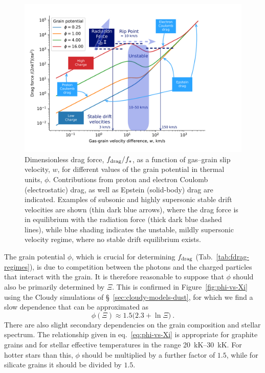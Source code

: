 \begin{figure}
  \includegraphics[width=\linewidth]{figs/gas-grain-drag-photoionized}
  \caption{Dimensionless drag force, \(f_{\text{drag}} / f_*\), as a function
    of gas--grain slip velocity, \(w\), for different values of the
    grain potential in thermal units, \(\phi\).  Contributions from
    proton and electron Coulomb (electrostatic) drag, as well as
    Epstein (solid-body) drag are indicated.  Examples of subsonic and
    highly supersonic stable drift velocities are shown (thin dark
    blue arrows), where the drag force is in equilibrium with the
    radiation force (thick dark blue dashed lines), while blue shading
    indicates the unstable, mildly supersonic velocity regime, where
    no stable drift equilibrium exists. }
  \label{fig:gas-grain-drag-photoionized}
\end{figure}

The grain potential \(\phi\), which is crucial for determining
\(f_{\text{drag}}\) (Tab.~\ref{tab:fdrag-regimes}), is due to competition
between the photons and the charged particles that interact with the
grain.  It is therefore reasonable to suppose that \(\phi\) should also
be primarily determined by \(\Xi\).  This is confirmed in
Figure~\ref{fig:phi-vs-Xi} using the Cloudy simulations of
\S~\ref{sec:cloudy-models-dust}, for which we find a slow dependence
that can be approximated as
\begin{equation}
  \label{eq:phi-vs-Xi}
  \phi(\Xi) \approx 1.5 \bigl( 2.3 +  \ln \Xi \bigr) \ .
\end{equation}
There are also slight secondary dependencies on the grain composition and
stellar spectrum.  The relationship given in eq.~\eqref{eq:phi-vs-Xi}
is appropriate for graphite grains and for stellar effective
temperatures in the range \SIrange{20}{30}{kK}.  For hotter stars than
this, \(\phi\) should be multiplied by a further factor of \(1.5\), while
for silicate grains it should be divided by \(1.5\).

